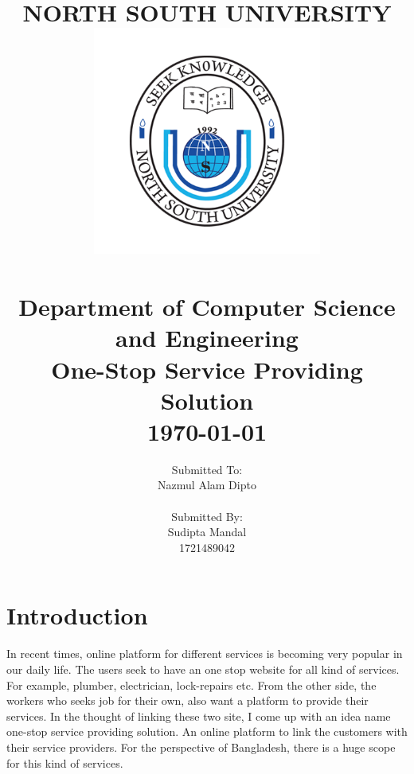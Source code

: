 \documentclass[14pt]{report}
\begin{document}
\date{}

\title{ \normalsize NORTH SOUTH UNIVERSITY
		\\ [1.0cm]
		\includegraphics[width=75mm]{img/nsu-logo.png}\\[1cm]
		\\Department of Computer Science and Engineering\\
		\LARGE \textbf{One-Stop Service Providing Solution\\}
		\normalsize \today \vspace*{5\baselineskip}}
		
\date{}

\author{
        
        Submitted To: \\
        Nazmul Alam Dipto \\ \\
        
        Submitted By:   \\
		Sudipta Mandal  \\
		 1721489042}
		 
\maketitle

\section*{\LARGE Introduction}

\begin{Large}
In recent times, online platform for different services is becoming very popular in our daily life. The users seek to have an one stop website for all kind of services. For example, plumber, electrician, lock-repairs etc. From the other side, the workers who seeks job for their own, also want a platform to provide their services. In the thought of linking these two site, I come up with an idea name one-stop service providing solution. An online platform to link the customers with their service providers. For the perspective of Bangladesh, there is a huge scope for this kind of services.
\end{Large}
\end{document}
